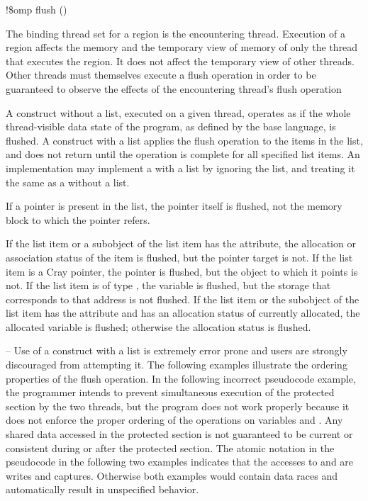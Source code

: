 {{{{\begin{boxedcode}
!\$omp flush \plc{[}()\plc{]}
\end{boxedcode}
\fortranspecificend

\binding
The binding thread set for a  region is the encountering thread. Execution of a 
 region affects the memory and the temporary view of memory of only the thread 
that executes the region. It does not affect the temporary view of other threads. Other 
threads must themselves execute a flush operation in order to be guaranteed to observe 
the effects of the encountering thread’s flush operation

\descr
A  construct without a list, executed on a given thread, operates as if the whole 
thread-visible data state of the program, as defined by the base language, is flushed. A 
 construct with a list applies the flush operation to the items in the list, and does 
not return until the operation is complete for all specified list items. An implementation 
may implement a  with a list by ignoring the list, and treating it the same as a 
 without a list.

\ccppspecificstart
If a pointer is present in the list, the pointer itself is flushed, not the memory block to 
which the pointer refers.
\ccppspecificend

\fortranspecificstart
If the list item or a subobject of the list item has the  attribute, the allocation 
or association status of the  item is flushed, but the pointer target is not. If the 
list item is a Cray pointer, the pointer is flushed, but the object to which it points is not. 
If the list item is of type , the variable is flushed, but the storage that corresponds 
to that address is not flushed. If the list item or the subobject of the list item has the 
 attribute and has an allocation status of currently allocated, the 
allocated variable is flushed; otherwise the allocation status is flushed.
\fortranspecificend

\begin{samepage}
\notestart
\noteheader – Use of a  construct with a list is extremely error prone and users are 
strongly discouraged from attempting it. The following examples illustrate the ordering 
properties of the flush operation. In the following incorrect pseudocode example, the 
programmer intends to prevent simultaneous execution of the protected section by the 
two threads, but the program does not work properly because it does not enforce the 
proper ordering of the operations on variables  and . Any shared data accessed in the 
protected section is not guaranteed to be current or consistent during or after the 
protected section. The atomic notation in the pseudocode in the following two examples 
indicates that the accesses to  and  are  writes and captures. Otherwise both 
examples would contain data races and automatically result in unspecified behavior. 
\end{samepage}

}}}}
